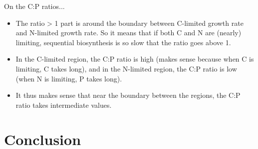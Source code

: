 On the C:P ratios...
\begin{itemize}
  \item The ratio > 1 part is around the boundary between C-limited growth rate and N-limited growth rate.
        So it means that if both C and N are (nearly) limiting, sequential biosynthesis is so slow that the ratio goes above 1.
  \item In the C-limited region, the C:P ratio is high (makes sense because when C is limiting, C takes long), and in the N-limited region, the C:P ratio is low (when N is limiting, P takes long).
  \item It thus makes sense that near the boundary between the regions, the C:P ratio takes intermediate values.
\end{itemize}

\section{Conclusion}
\label{subsec:model-conclusion}


